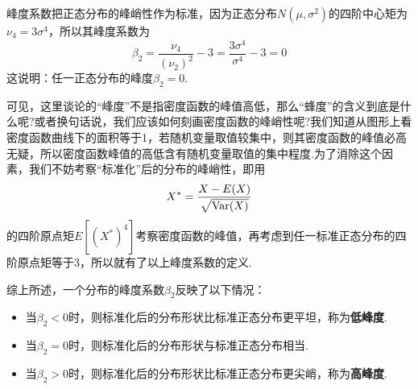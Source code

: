 峰度系数把正态分布的峰峭性作为标准，因为正态分布$N(\mu,\sigma^2)$的四阶中心矩为$\nu_4=3\sigma^4$，所以其峰度系数为
\[ \beta_2 = \frac{\nu_4}{(\nu_2)^2} - 3 = \frac{3\sigma^4}{\sigma^4} - 3 = 0 \]
这说明：任一正态分布的峰度$\beta_2=0$.

可见，这里谈论的“峰度”不是指密度函数的峰值高低，那么“蜂度”的含义到底是什么呢?或者换句话说，我们应该如何刻画密度函数的峰峭性呢?我们知道从图形上看密度函数曲线下的面积等于1，若随机变量取值较集中，则其密度函数的峰值必高无疑，所以密度函数峰值的高低含有随机变量取值的集中程度.为了消除这个因素，我们不妨考察“标准化”后的分布的峰峭性，即用
\[ X^\ast = \frac{X - E(X)} {\sqrt{\operatorname{Var}(X)}} \]
的四阶原点矩$E[(X^\ast)^4]$考察密度函数的峰值，再考虑到任一标准正态分布的四阶原点矩等于3，所以就有了以上峰度系数的定义.

综上所述，一个分布的峰度系数$\beta_2$反映了以下情况：
\begin{itemize}
    \item 当$\beta_2<0$时，则标准化后的分布形状比标准正态分布更平坦，称为\textbf{低峰度}.
    \item 当$\beta_2=0$时，则标准化后的分布形状与标准正态分布相当.
    \item 当$\beta_2>0$时，则标准化后的分布形状比标准正态分布更尖峭，称为\textbf{高峰度}.
\end{itemize}


